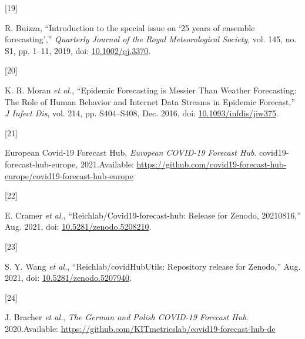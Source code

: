 \documentclass[
]{article}
\newlength{\cslhangindent}
\newlength{\csllabelwidth}
\newlength{\cslentryspacingunit} %
\newenvironment{CSLReferences}[2] %
 {%
  \setlength{\parindent}{0pt}
  \ifodd #1
  \let\oldpar\par
  \def\par{\hangindent=\cslhangindent\oldpar}
  \fi
  \setlength{\parskip}{#2\cslentryspacingunit}
 }%
 {}
\newcommand{\CSLLeftMargin}[1]{\parbox[t]{\csllabelwidth}{#1}}
\newcommand{\CSLRightInline}[1]{\parbox[t]{\linewidth - \csllabelwidth}{#1}\break}
\providecommand{\DIFaddbegin}{} %
\providecommand{\DIFaddend}{} %
\providecommand{\DIFdelbegin}{} %
\providecommand{\DIFdelend}{} %
\newcommand{\DIFscaledelfig}{0.5}
\newlength{\DIFdelgraphicswidth} %
\newlength{\DIFdelgraphicsheight} %
\newcommand{\DIFaddincludegraphics}[2][]{{\color{blue}\fbox{\DIFOincludegraphics[#1]{#2}}}} %
\newcommand{\DIFdelincludegraphics}[2][]{%
\sbox{\DIFdelgraphicsbox}{\DIFOincludegraphics[#1]{#2}}%
\settoboxwidth{\DIFdelgraphicswidth}{\DIFdelgraphicsbox} %
\settoboxtotalheight{\DIFdelgraphicsheight}{\DIFdelgraphicsbox} %
\scalebox{\DIFscaledelfig}{%
\parbox[b]{\DIFdelgraphicswidth}{\usebox{\DIFdelgraphicsbox}\\[-\baselineskip] \rule{\DIFdelgraphicswidth}{0em}}\llap{\resizebox{\DIFdelgraphicswidth}{\DIFdelgraphicsheight}{%
\setlength{\unitlength}{\DIFdelgraphicswidth}%
\begin{picture}(1,1)%
\thicklines\linethickness{2pt} %
{\color[rgb]{1,0,0}\put(0,0){\framebox(1,1){}}}%
{\color[rgb]{1,0,0}\put(0,0){\line( 1,1){1}}}%
{\color[rgb]{1,0,0}\put(0,1){\line(1,-1){1}}}%
\end{picture}%
}\hspace*{3pt}}} %
} %
\DeclareRobustCommand{\DIFaddbegin}{\DIFOaddbegin \let\includegraphics\DIFaddincludegraphics} %
\DeclareRobustCommand{\DIFaddend}{\DIFOaddend \let\includegraphics\DIFOincludegraphics} %
\DeclareRobustCommand{\DIFdelbegin}{\DIFOdelbegin \let\includegraphics\DIFdelincludegraphics} %
\DeclareRobustCommand{\DIFdelend}{\DIFOaddend \let\includegraphics\DIFOincludegraphics} %
\begin{document}
\begin{CSLReferences}{0}{0}
\leavevmode{}%
\DIFdelbegin %
\DIFdelend \DIFaddbegin \CSLLeftMargin{{[}19{]} }
\DIFaddend \CSLRightInline{R. Buizza, {``Introduction to the special issue on {`25 years of ensemble forecasting'},''} \emph{Quarterly Journal of the Royal Meteorological Society}, vol. 145, no. S1, pp. 1--11, 2019, doi: \href{https://doi.org/10.1002/qj.3370}{10.1002/qj.3370}.}

\leavevmode{}%
\DIFdelbegin %
\DIFdelend \DIFaddbegin \CSLLeftMargin{{[}20{]} }
\DIFaddend \CSLRightInline{K. R. Moran \emph{et al.}, {``Epidemic {Forecasting} is {Messier Than Weather Forecasting}: {The Role} of {Human Behavior} and {Internet Data Streams} in {Epidemic Forecast},''} \emph{J Infect Dis}, vol. 214, pp. S404--S408, Dec. 2016, doi: \href{https://doi.org/10.1093/infdis/jiw375}{10.1093/infdis/jiw375}.}

\leavevmode{}%
\DIFdelbegin %
\DIFdelend \DIFaddbegin \CSLLeftMargin{{[}21{]} }
\DIFaddend \CSLRightInline{European Covid-19 Forecast Hub, \emph{European {COVID-19 Forecast Hub}}. {covid19-forecast-hub-europe}, 2021.Available: \url{https://github.com/covid19-forecast-hub-europe/covid19-forecast-hub-europe}}

\leavevmode{}%
\DIFdelbegin %
\DIFdelend \DIFaddbegin \CSLLeftMargin{{[}22{]} }
\DIFaddend \CSLRightInline{E. Cramer \emph{et al.}, {``Reichlab/Covid19-forecast-hub: Release for {Zenodo}, 20210816,''} Aug. 2021, doi: \href{https://doi.org/10.5281/zenodo.5208210}{10.5281/zenodo.5208210}.}

\leavevmode{}%
\DIFdelbegin %
\DIFdelend \DIFaddbegin \CSLLeftMargin{{[}23{]} }
\DIFaddend \CSLRightInline{S. Y. Wang \emph{et al.}, {``Reichlab/{covidHubUtils}: Repository release for {Zenodo},''} Aug. 2021, doi: \href{https://doi.org/10.5281/zenodo.5207940}{10.5281/zenodo.5207940}.}

\leavevmode{}%
\DIFdelbegin %
\DIFdelend \DIFaddbegin \CSLLeftMargin{{[}24{]} }
\DIFaddend \CSLRightInline{J. Bracher \emph{et al.}, \emph{The {German} and {Polish COVID-19 Forecast Hub}}. 2020.Available: \url{https://github.com/KITmetricslab/covid19-forecast-hub-de}}


\end{CSLReferences}
\end{document}

